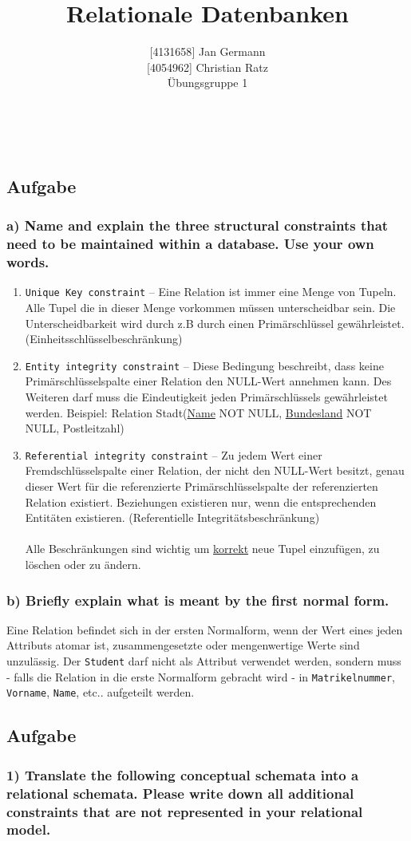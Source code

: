 \documentclass[11pt,a4paper,DIV=9]{scrartcl}
\author{{[}4131658{]} Jan Germann \\{[}4054962{]} Christian Ratz\\Übungsgruppe 1}
\title{Relationale Datenbanken}
\newcounter{temp}
\newcommand{\aufgabe}[1]{
  \setcounter{temp}{\value{subsection}}
  \setcounter{subsection}{#1}
  \addtocounter{subsection}{-1}
  \subsection{Aufgabe}
  \setcounter{subsection}{\value{temp}}
}
\newcommand{\teil}[2][]{
  \subsubsection*{#2) #1}
}
\renewcommand{\author}[1]{\renewcommand{\author}{#1}}
\renewcommand{\title}[1]{\renewcommand{\title}{#1}}
\newcommand{\makehomeworktitle}{
  \begin{minipage}[t]{6.5cm}
    \sf{\author}
  \end{minipage}
  \begin{minipage}[t]{6.5cm}
    \begin{flushright}
      \sf{\title\\\today}
    \end{flushright}
  \end{minipage}
  \\[0.2cm]
  \begin{center}
    \sf{
      \color{blue}{
        \LARGE{Aufgabenblatt \blattnr}
      }
    }
  \end{center}
  \vspace{0.1cm}
}
\begin{document}
\makehomeworktitle

\aufgabe{1}
\teil[Name and explain the three structural constraints that need to be maintained within a database. Use your own words.]{a}
  \begin{enumerate}
    \item \texttt{Unique Key constraint} -- Eine Relation ist immer eine Menge von Tupeln. Alle Tupel die in dieser Menge vorkommen m\"ussen unterscheidbar sein. Die Unterscheidbarkeit wird durch z.B durch einen Prim\"arschl\"ussel gew\"ahrleistet. (Einheitsschl\"usselbeschr\"ankung)
    \item \texttt{Entity integrity constraint} -- Diese Bedingung beschreibt, dass keine Prim\"arschl\"usselspalte einer Relation den NULL-Wert annehmen kann. Des Weiteren darf muss die Eindeutigkeit jeden Prim\"arschl\"ussels gew\"ahrleistet werden. Beispiel: Relation Stadt(\underline{Name} NOT NULL, \underline{Bundesland} NOT NULL, Postleitzahl)
    \item \texttt{Referential integrity constraint} -- Zu jedem Wert einer Fremdschl\"usselspalte einer Relation, der nicht den NULL-Wert besitzt, genau dieser Wert f\"ur die referenzierte Prim\"arschl\"usselspalte der referenzierten Relation existiert. Beziehungen existieren nur, wenn die entsprechenden Entit\"aten existieren. (Referentielle Integrit\"atsbeschr\"ankung)
    \\\\ Alle Beschr\"ankungen sind wichtig um \underline{korrekt} neue Tupel einzuf\"ugen, zu l\"oschen oder zu \"andern.
  \end{enumerate}
\teil[Briefly explain what is meant by the first normal form.]{b}
  Eine Relation befindet sich in der ersten Normalform, wenn der Wert eines jeden Attributs atomar ist, zusammengesetzte oder mengenwertige Werte sind unzul\"assig. Der \texttt{Student} darf nicht als Attribut verwendet werden, sondern muss - falls die Relation in die erste Normalform gebracht wird - in \texttt{Matrikelnummer}, \texttt{Vorname}, \texttt{Name}, etc.. aufgeteilt werden.

\newpage  
\aufgabe{2}
  \teil[Translate the following conceptual schemata into a relational schemata. Please write down all additional constraints that are not represented in your relational model.]{1}
\end{document}
